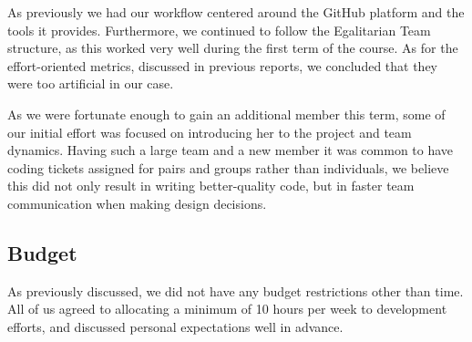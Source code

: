 \documentclass[main.tex]{subfiles}
\begin{document}
As previously we had our workflow centered around the GitHub platform and the tools it provides.
Furthermore, we continued to follow the Egalitarian Team structure, as this worked very well during the first term of the course. As for the effort-oriented metrics, discussed in previous reports, we concluded that they were too artificial in our case.

As we were fortunate enough to gain an additional member this term, some of our initial effort was focused on introducing her to the project and team dynamics. Having such a large team and a new member it was common to have coding tickets assigned for pairs and groups rather than individuals, we believe this did not only result in writing better-quality code, but in faster team communication when making design decisions.

\subsection{Budget}
As previously discussed, we did not have any budget restrictions other than time. All of us agreed to allocating a minimum of 10 hours per week to development efforts, and discussed personal expectations well in advance. 
\end{document}
